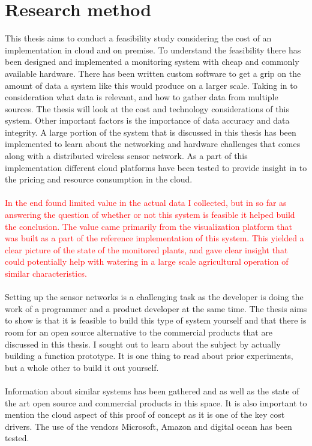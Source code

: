 \documentclass[]{uiophd}
\begin{document}
\section{Research method}
 This thesis aims to conduct a feasibility study considering the cost of an implementation in cloud and on premise. To understand the feasibility there has been designed and implemented a monitoring system with cheap and commonly available hardware. There has been written custom software to get a grip on the amount of data a system like this would produce on a larger scale. Taking in to consideration what data is relevant, and how to gather data from multiple sources. The thesis will look at the cost and technology considerations of this system. Other important factors is the importance of data accuracy and data integrity. A large portion of the system that is discussed in this thesis has been implemented to learn about the networking and hardware challenges that comes along with a distributed wireless sensor network. As a part of this implementation different cloud platforms have been tested to provide insight in to the pricing and resource consumption in the cloud. 
\\\\
\textcolor{red}{In the end found limited value in the actual data I collected, but in so far as answering the question of whether or not this system is feasible it helped build the conclusion. The value came primarily from the visualization platform that was built as a part of the reference implementation of this system. This yielded a clear picture of the state of the monitored plants, and gave clear insight that could potentially help with watering in a large scale agricultural operation of similar characteristics.}
\\\\
Setting up the sensor networks is a challenging task as the developer is doing the work of a programmer and a product developer at the same time. The thesis aims to show is that it is feasible to build this type of system yourself and that there is room for an open source alternative to the commercial products that are discussed in this thesis. I sought out to learn about the subject by actually building a function prototype. It is one thing to read about prior experiments, but a whole other to build it out yourself.
\\\\
Information about similar systems has been gathered and as well as the state of the art open source and commercial products in this space. It is also important to mention the cloud aspect of this proof of concept as it is one of the key cost drivers. The use of the vendors Microsoft, Amazon and digital ocean has been tested.
\end{document}
